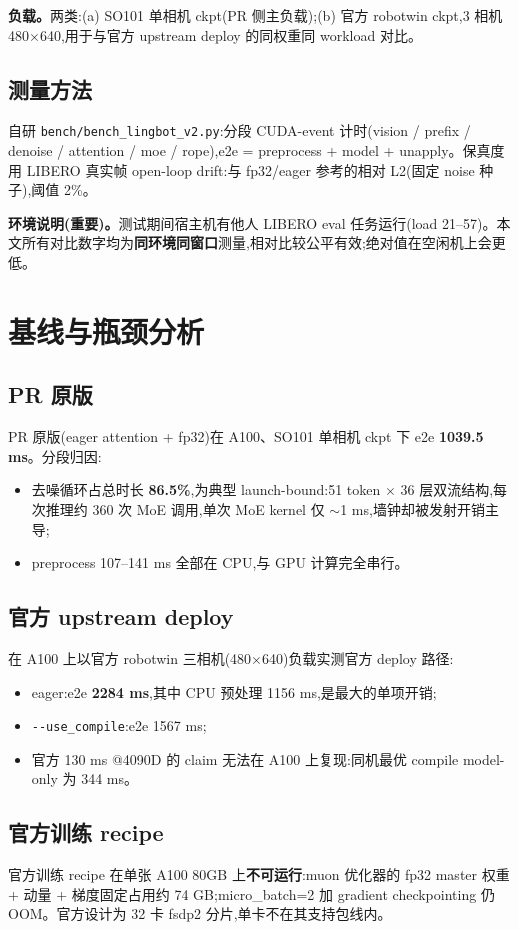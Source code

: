 \documentclass[11pt]{ctexart}
\begin{document}
\textbf{负载。}两类:(a) SO101 单相机 ckpt(PR 侧主负载);(b) 官方 robotwin ckpt,3 相机 480$\times$640,用于与官方 upstream deploy 的同权重同 workload 对比。

\subsection{测量方法}
自研 \texttt{bench/bench\_lingbot\_v2.py}:分段 CUDA-event 计时(vision / prefix / denoise / attention / moe / rope),e2e = preprocess + model + unapply。保真度用 LIBERO 真实帧 open-loop drift:与 fp32/eager 参考的相对 L2(固定 noise 种子),阈值 2\%。

\textbf{环境说明(重要)。}测试期间宿主机有他人 LIBERO eval 任务运行(load 21--57)。本文所有对比数字均为\textbf{同环境同窗口}测量,相对比较公平有效;绝对值在空闲机上会更低。

\section{基线与瓶颈分析}
\subsection{PR 原版}
PR 原版(eager attention + fp32)在 A100、SO101 单相机 ckpt 下 e2e \textbf{1039.5 ms}。分段归因:
\begin{itemize}
\item 去噪循环占总时长 \textbf{86.5\%},为典型 launch-bound:51 token $\times$ 36 层双流结构,每次推理约 360 次 MoE 调用,单次 MoE kernel 仅 $\sim$1 ms,墙钟却被发射开销主导;
\item preprocess 107--141 ms 全部在 CPU,与 GPU 计算完全串行。
\end{itemize}

\subsection{官方 upstream deploy}
在 A100 上以官方 robotwin 三相机(480$\times$640)负载实测官方 deploy 路径:
\begin{itemize}
\item eager:e2e \textbf{2284 ms},其中 CPU 预处理 1156 ms,是最大的单项开销;
\item \texttt{-{}-use\_compile}:e2e 1567 ms;
\item 官方 130 ms @4090D 的 claim 无法在 A100 上复现:同机最优 compile model-only 为 344 ms。
\end{itemize}

\subsection{官方训练 recipe}
官方训练 recipe 在单张 A100 80GB 上\textbf{不可运行}:muon 优化器的 fp32 master 权重 + 动量 + 梯度固定占用约 74 GB;micro\_batch=2 加 gradient checkpointing 仍 OOM。官方设计为 32 卡 fsdp2 分片,单卡不在其支持包线内。
\end{document}
